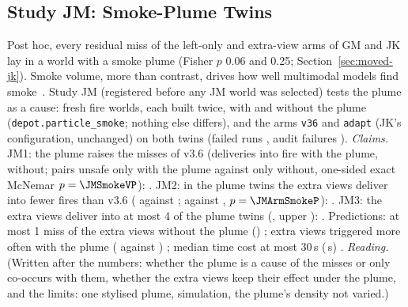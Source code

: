 \subsection{Study JM: Smoke-Plume Twins}\label{sec:moved-jm}
Post hoc, every residual miss of the left-only and extra-view arms of GM and JK lay in a world with a smoke plume (Fisher $p$ 0.06 and 0.25; Section~\ref{sec:moved-jk}). Smoke volume, more than contrast, drives how well multimodal models find smoke~\cite{qi2026smokebench}. Study JM (registered before any JM world was selected) tests the plume as a cause: \JMTwins{} fresh fire worlds, each built twice, with and without the plume (\texttt{depot.particle\_smoke}; nothing else differs), and the arms \texttt{v36} and \texttt{adapt} (JK's configuration, unchanged) on both twins (failed runs \JMFailed, audit failures \JMAudit).
\emph{Claims.} JM1: the plume raises the misses of v3.6 (deliveries into fire \JMVSmoke{} with the plume, \JMVClear{} without; \JMSmokeVFirst{} pairs unsafe only with the plume against \JMSmokeVSecond{} only without, one-sided exact McNemar $p=\JMSmokeVP$): \JMOneHolds. JM2: in the plume twins the extra views deliver into fewer fires than v3.6 (\JMAdaptSmoke{} against \JMVSmoke; \JMArmSmokeFirst{} against \JMArmSmokeSecond, $p=\JMArmSmokeP$): \JMTwoHolds. JM3: the extra views deliver into at most 4 of the plume twins (\JMAdaptSmoke, upper \JMAdaptSmokeUpper): \JMThreeHolds. Predictions: at most 1 miss of the extra views without the plume (\JMAdaptClear) \JMPredOneHolds; extra views triggered more often with the plume (\JMTrigSmoke{} against \JMTrigClear) \JMPredTwoHolds; median time cost at most 30\,s (\JMTimeCost\,s) \JMPredThreeHolds.
\emph{Reading.} (Written after the numbers: whether the plume is a cause of the misses or only co-occurs with them, whether the extra views keep their effect under the plume, and the limits: one stylised plume, simulation, the plume's density not varied.)
